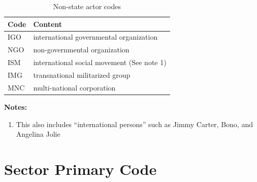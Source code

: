 \documentclass[11pt]{report}
\begin{document}
\begin{table}[htp]
\caption{Non-state actor codes}
\begin{center}
\begin{tabular}{|l|l|}
\hline
Code & Content \\
\hline
IGO   &   international governmental organization\\
NGO &   non-governmental organization\\
ISM           &   international social movement (See note 1)\\
IMG            &   transnational militarized group\\
MNC            &   multi-national corporation\\
\hline
\end{tabular}
\end{center}
\label{tab:nonstate}
\noindent \textbf{Notes:}
\begin{enumerate}
\item This also includes ``international persons'' such as Jimmy Carter, Bono, and Angelina Jolie  
\end{enumerate}
\end{table}%

\section{Sector Primary Code}
\end{document}
